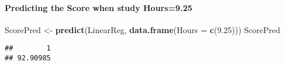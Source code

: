\documentclass[
]{article}
\newenvironment{Shaded}{\begin{snugshade}}{\end{snugshade}}
\newcommand{\DataTypeTok}[1]{\textcolor[rgb]{0.13,0.29,0.53}{#1}}
\newcommand{\FloatTok}[1]{\textcolor[rgb]{0.00,0.00,0.81}{#1}}
\newcommand{\KeywordTok}[1]{\textcolor[rgb]{0.13,0.29,0.53}{\textbf{#1}}}
\newcommand{\NormalTok}[1]{#1}
\newcommand{\StringTok}[1]{\textcolor[rgb]{0.31,0.60,0.02}{#1}}
\begin{document}
\hypertarget{predicting-the-score-when-study-hours9.25}{%
\paragraph{Predicting the Score when study
Hours=9.25}\label{predicting-the-score-when-study-hours9.25}}

\begin{Shaded}
\begin{Highlighting}[]
\NormalTok{ScorePred <-}\StringTok{ }\KeywordTok{predict}\NormalTok{(LinearReg, }\KeywordTok{data.frame}\NormalTok{(}\DataTypeTok{Hours =} \KeywordTok{c}\NormalTok{(}\FloatTok{9.25}\NormalTok{)))}
\NormalTok{ScorePred}
\end{Highlighting}
\end{Shaded}

\begin{verbatim}
##        1 
## 92.90985
\end{verbatim}
\end{document}
